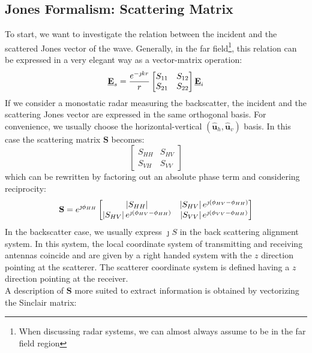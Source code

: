 \documentclass[11pt]{article}
\begin{document}
\subsection{Jones Formalism: Scattering Matrix}
To start, we want to investigate the relation between the incident and the scattered Jones vector of the wave. Generally, in the far field\footnote{When discussing radar systems, we can almost always assume to be in the far field region}, this relation can be expressed in a very elegant way as a vector-matrix operation:
\begin{equation}
	\mathbf{\underline{E}}_{s} = \frac{e^{-\jmath k r}}{r}
	\begin{bmatrix}
		S_{11} & S_{12}\\
		S_{21} & S_{22}
	\end{bmatrix}
	\mathbf{\underline{E}}_{i}
\end{equation}
If we consider a monostatic radar measuring the backscatter, the incident and the scattering Jones vector are expressed in the same orthogonal basis. For convenience, we usually choose the horizontal-vertical $\left(\hat{\mathbf{u}}_{h},\hat{\mathbf{u}}_v\right)$ basis. In this case the scattering matrix $\mathbf{S}$ becomes:
\begin{equation}
	\begin{bmatrix}
		S_{HH} & S_{HV}\\
		S_{VH} & S_{VV}
	\end{bmatrix}
\end{equation}
 which can be rewritten by factoring out an absolute phase term and considering reciprocity:
 \begin{equation}
 	\mathbf{S} = e^{\jmath \phi_{HH}}
 	\begin{bmatrix}
 		\left|S_{HH}\right| & \left|S_{HV}\right|e^{\jmath \left(\phi_{HV} - \phi_{HH}\right)}\\
		\left|S_{HV}\right|e^{\jmath \left(\phi_{HV} - \phi_{HH}\right)} 
		& \left|S_{VV}\right|e^{\jmath \left(\phi_{VV} - \phi_{HH}\right)}
	\end{bmatrix}
 \end{equation}
 In the backscatter case, we usually express $\jmath{S}$ in the back scattering alignment system. In this system, the local coordinate system of transmitting and receiving antennas coincide and are given by a right handed system with the $z$ direction pointing at the scatterer. The scatterer coordinate system is defined having a $z$ direction pointing at the receiver.\\
A description of $\mathbf{S}$ more suited to extract information is obtained by vectorizing the Sinclair matrix:
\end{document}
